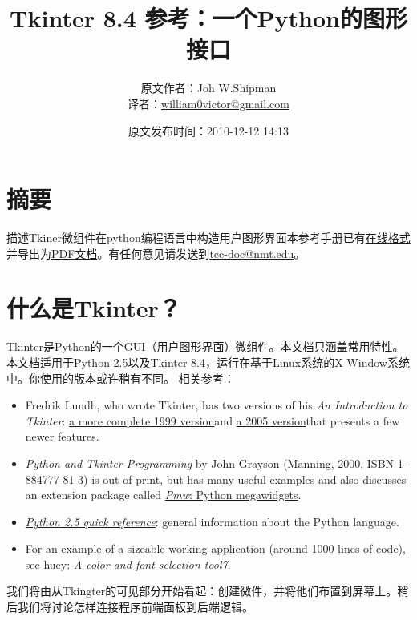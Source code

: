 \documentclass[11pt,a4paper,oneside]{book}
\title{\huge \textbf{\textsf{Tkinter 8.4 参考：一个Python的图形接口}}}
\author{原文作者：\textsf{Joh W.Shipman}\\译者：\href{mailto:william0victor@gmail.com}{\textsf{william0victor@gmail.com}}}
\date{原文发布时间：\textsf{2010-12-12 14:13}}
\begin{document}
\maketitle%
\chapter*{\Large{摘要}}
描述Tkiner微组件在python编程语言中构造用户图形界面本参考手册已有\href{http://www.nmt.edu/tcc/help/pubs/tkinter/}{在线格式\footnotemark[1]}并导出为\href{http://www.nmt.edu/tcc/help/pubs/tkinter/tkinter.pdf}{PDF文档\footnotemark[2]}。有任何意见请发送到\href{mailto:tcc-doc@nmt.edu}{tcc-doc@nmt.edu}。
\begin{tableofcontents}%

\end{tableofcontents}%
\chapter[什么是Tkinter？]{什么是Tkinter？}%
Tkinter是Python的一个GUI（用户图形界面）微组件。本文档只涵盖常用特性。
本文档适用于Python 2.5以及Tkinter 8.4，运行在基于Linux系统的X Window系统中。你使用的版本或许稍有不同。
相关参考：
\begin{itemize}
\item Fredrik Lundh, who wrote Tkinter, has two versions of his \textit{An Introduction to Tkinter}: \href{http://www.pythonware.com/library/tkinter/introduction/}{a more complete 1999 version}\footnotemark[3] and \href{http://effbot.org/tkinterbook/}{a 2005 version}\footnotemark[4] that presents a few newer features. 

\item \textit{ Python and Tkinter Programming} by John Grayson (Manning, 2000, ISBN 1-884777-81-3) is out of print, but has many useful examples and also discusses an extension package called \href{http://pmw.sourceforge.net/}{\textit{Pmw}: Python megawidgets}\footnotemark[5]. 

\item \href{http://www.nmt.edu/tcc/help/pubs/python/web/}{\textit{Python 2.5 quick reference}}\footnotemark[6]: general information about the Python language. 

\item For an example of a sizeable working application (around 1000 lines of code), see huey: \href{http://www.nmt.edu/tcc/help/lang/python/examples/huey/}{\textit{A color and font selection tool7}}\footnotemark[7]. 
\end{itemize}
我们将由从Tkingter的可见部分开始看起：创建微件，并将他们布置到屏幕上。稍后我们将讨论怎样连接程序前端面板到后端逻辑。
\end{document}
